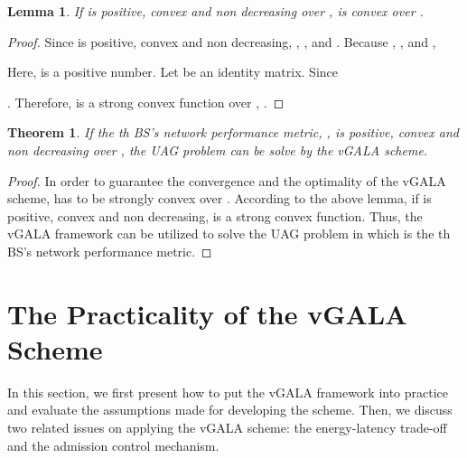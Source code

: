 \documentclass[journal]{IEEEtran}
\newtheorem{theorem}{Theorem}
\newtheorem{lemma}{Lemma}
\theoremstyle{definition}
\begin{document}
\begin{lemma}
\label{thm:gen_lemma}
If  is positive, convex and non decreasing over ,  is convex over .
\end{lemma}
\begin{proof}
Since  is positive, convex and non decreasing, , , and . Because , , and ,

Here,  is a positive number. Let  be an identity matrix.
Since

. Therefore,  is a strong convex function over , .
\end{proof}

\begin{theorem}
\label{thm:gen_vgala}
If the th BS's network performance metric, , is positive, convex and non decreasing over , the UAG problem can be solve by the vGALA scheme.
\end{theorem}
\begin{proof}
\label{prf:gen_vgala}
In order to guarantee the convergence and the optimality of the vGALA scheme,  has to be strongly convex over . According to the above lemma, if  is positive, convex and non decreasing,  is a strong convex function. Thus, the vGALA framework can be utilized to solve the UAG problem in which  is the th BS's network performance metric.
\end{proof}


\section{The Practicality of the vGALA Scheme}
\label{sec:tradeoff_admission}
In this section, we first present how to put the vGALA framework into practice and evaluate the assumptions made for developing the scheme. Then, we discuss two related issues on applying the vGALA scheme: the energy-latency trade-off and the admission control mechanism.
\end{document}
